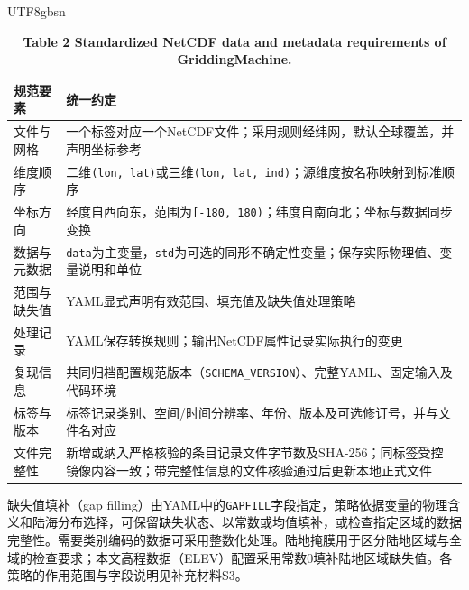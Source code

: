 \documentclass[numdoi]{chinese}
\newlength{\gmTableWidth}
\begin{document}
\begin{CJK}{UTF8}{gbsn}
\begin{table}[!htbp]\centering
\begingroup\singlespacing\small\setlength{\tabcolsep}{9pt}\renewcommand{\arraystretch}{1.12}
\captionsetup{justification=centering}
\setlength{\gmTableWidth}{\dimexpr\linewidth-2\tabcolsep\relax}
\caption*{\textbf{表2 GriddingMachine 标准 NetCDF 数据与元数据规范}}
\caption*{\textbf{Table 2 Standardized NetCDF data and metadata requirements of GriddingMachine.}}
\begin{tabular}{@{}>{\raggedright\arraybackslash}p{0.20\gmTableWidth}>{\raggedright\arraybackslash}p{0.80\gmTableWidth}@{}}
\toprule
\textbf{规范要素} & \textbf{统一约定} \\
\midrule
文件与网格 & 一个标签对应一个NetCDF文件；采用规则经纬网，默认全球覆盖，并声明坐标参考 \\
\midrule[0.25pt]
维度顺序 & 二维\nolinkurl{(lon, lat)}或三维\nolinkurl{(lon, lat, ind)}；源维度按名称映射到标准顺序 \\
\midrule[0.25pt]
坐标方向 & 经度自西向东，范围为\nolinkurl{[-180, 180)}；纬度自南向北；坐标与数据同步变换 \\
\midrule[0.25pt]
数据与元数据 & \nolinkurl{data}为主变量，\nolinkurl{std}为可选的同形不确定性变量；保存实际物理值、变量说明和单位 \\
\midrule[0.25pt]
范围与缺失值 & YAML显式声明有效范围、填充值及缺失值处理策略 \\
\midrule[0.25pt]
处理记录 & YAML保存转换规则；输出NetCDF属性记录实际执行的变更 \\
\midrule[0.25pt]
复现信息 & 共同归档配置规范版本（\nolinkurl{SCHEMA_VERSION}）、完整YAML、固定输入及代码环境 \\
\midrule[0.25pt]
标签与版本 & 标签记录类别、空间/时间分辨率、年份、版本及可选修订号，并与文件名对应 \\
\midrule[0.25pt]
文件完整性 & 新增或纳入严格核验的条目记录文件字节数及SHA-256；同标签受控镜像内容一致；带完整性信息的文件核验通过后更新本地正式文件 \\
\bottomrule
\end{tabular}
\endgroup
\label{tab:2}
\end{table}
缺失值填补（gap filling）由YAML中的\nolinkurl{GAPFILL}字段指定，策略依据变量的物理含义和陆海分布选择，可保留缺失状态、以常数或均值填补，或检查指定区域的数据完整性。需要类别编码的数据可采用整数化处理。陆地掩膜用于区分陆地区域与全域的检查要求；本文高程数据（ELEV）配置采用常数0填补陆地区域缺失值。各策略的作用范围与字段说明见补充材料S3。


\end{CJK}
\end{document}
